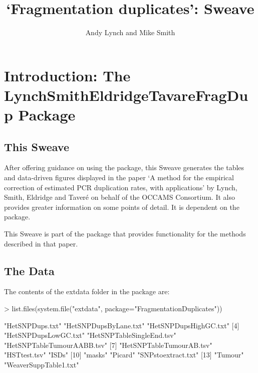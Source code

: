 \documentclass{article}
\title{`Fragmentation duplicates': Sweave}
\author{Andy Lynch and Mike Smith}
\begin{document}


\maketitle
\tableofcontents





\clearpage{}

\section{Introduction: The LynchSmithEldridgeTavareFragDup Package}

\subsection{This Sweave}

After offering guidance on using the package, this Sweave generates the tables and data-driven figures displayed in the paper `A method for the empirical correction of estimated PCR duplication rates, with applications' by Lynch, Smith, Eldridge and Taver\'{e} on behalf of the OCCAMS Consortium. It also provides greater information on some points of detail. It is dependent on the \Bioconductor{}  package.

This Sweave is part of the \R{} package  that provides functionality for the methods described in that paper. 

\subsection{The Data}

The contents of the extdata folder in the package are:

\begin{Schunk}
\begin{Sinput}
> list.files(system.file("extdata", package="FragmentationDuplicates"))
\end{Sinput}
\begin{Soutput}
 [1] "HetSNPDups.txt"            "HetSNPDupsByLane.txt"      "HetSNPDupsHighGC.txt"     
 [4] "HetSNPDupsLowGC.txt"       "HetSNPTableSingleEnd.tsv"  "HetSNPTableTumourAABB.tsv"
 [7] "HetSNPTableTumourAB.tsv"   "HSTtest.tsv"               "ISDs"                     
[10] "masks"                     "Picard"                    "SNPstoextract.txt"        
[13] "Tumour"                    "WeaverSuppTable1.txt"     
\end{Soutput}
\end{Schunk}
\end{document}
